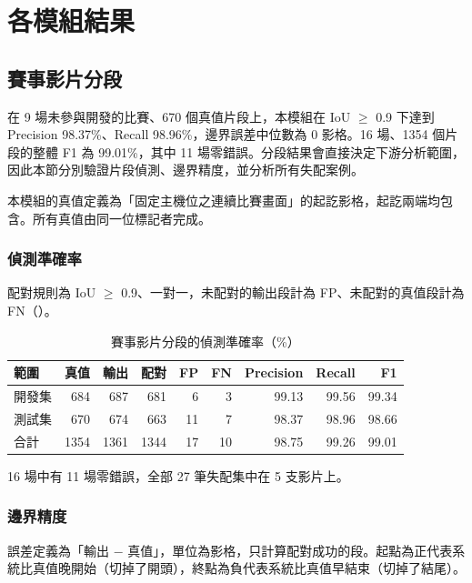 \section{各模組結果}
\label{sec:module-results}

\subsection{賽事影片分段}
\label{sec:exp-segmentation}

在 9 場未參與開發的比賽、670 個真值片段上，本模組在 IoU $\geq$ 0.9 下達到 Precision 98.37\%、Recall 98.96\%，邊界誤差中位數為 0 影格。16 場、1354 個片段的整體 F1 為 99.01\%，其中 11 場零錯誤。分段結果會直接決定下游分析範圍，因此本節分別驗證片段偵測、邊界精度，並分析所有失配案例。

本模組的真值定義為「固定主機位之連續比賽畫面」的起訖影格，起訖兩端均包含。所有真值由同一位標記者完成。

\subsubsection{偵測準確率}

配對規則為 IoU $\geq$ 0.9、一對一，未配對的輸出段計為 FP、未配對的真值段計為 FN（）。

\begin{table}[htbp]
  \centering
  \small
  \caption{賽事影片分段的偵測準確率（\%）}
  \label{tab:seg-accuracy}
  \begin{tabular}{|l|r|r|r|r|r|r|r|r|}
    \hline
    範圍 & 真值 & 輸出 & 配對 & FP & FN & Precision & Recall & F1 \\ \hline
    開發集 & 684 & 687 & 681 & 6 & 3 & 99.13 & 99.56 & 99.34 \\ \hline
    測試集 & 670 & 674 & 663 & 11 & 7 & 98.37 & 98.96 & 98.66 \\ \hline
    合計 & 1354 & 1361 & 1344 & 17 & 10 & 98.75 & 99.26 & 99.01 \\ \hline
  \end{tabular}
\end{table}

16 場中有 11 場零錯誤，全部 27 筆失配集中在 5 支影片上。

\subsubsection{邊界精度}

誤差定義為「輸出 $-$ 真值」，單位為影格，只計算配對成功的段。起點為正代表系統比真值晚開始（切掉了開頭），終點為負代表系統比真值早結束（切掉了結尾）。

